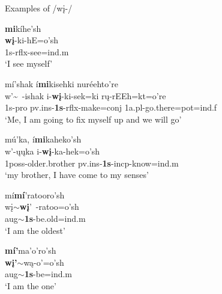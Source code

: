 \begin{exe}

\item\label{wiNexamples} Examples of /wį-/

	\begin{xlist}

	\item \glll \textbf{mi}kíhe'sh\\
	\textbf{wį}-ki-hE=o'sh\\
	1s-rflx-\textnormal{see}=ind.m\\
	\glt `I see myself' \citep[440]{hollow1970}
	
	\item \glll mí'shak í\textbf{mi}kisehki nuréehto're\\
	w'\~~-ishak i-\textbf{wį}-ki-sek=ki rų-rEEh=kt=o're\\
	1s-pro pv.ins-\textbf{1s}-rflx-\textnormal{make}=conj 1a.pl-\textnormal{go.there}=pot=ind.f\\
	\glt `Me, I am going to fix myself up and we will go' \citep[127]{hollow1973a}
	
	\item \glll mú'ka, í\textbf{mi}kaheko'sh\\
	w'-ųųka i-\textbf{wį}-ka-hek=o'sh\\
	1poss-\textnormal{older.brother} pv.ins-\textbf{1s}-incp-\textnormal{know}=ind.m\\
	\glt `my brother, I have come to my senses' \citep[144]{hollow1973a}
	
	
	\item \glll mí\textbf{mí}'ratooro'sh\\
	wį$\sim$\textbf{wį}'~-ratoo=o'sh\\
	aug$\sim$\textbf{1s}-\textnormal{be.old}=ind.m\\
	\glt `I am the oldest' \citep[6]{hollow1973a}
	
	\item \glll \textbf{mí'}ma'o'ro'sh\\
	\textbf{wį'}$\sim$wą-o'=o'sh\\
	aug$\sim$\textbf{1s}-\textnormal{be}=ind.m\\
	\glt `I am the one' \citep[121]{hollow1973a}
	
	\end{xlist}

\end{exe}

